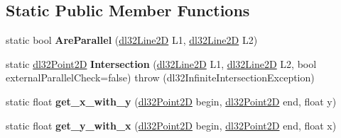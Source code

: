 \subsection*{Static Public Member Functions}
\begin{DoxyCompactItemize}
\item 
\hypertarget{classdl32_line2_d_a9a0d706a3d8b539e59c953d84c6b7fa3}{static bool {\bfseries Are\-Parallel} (\hyperlink{classdl32_line2_d}{dl32\-Line2\-D} L1, \hyperlink{classdl32_line2_d}{dl32\-Line2\-D} L2)}\label{classdl32_line2_d_a9a0d706a3d8b539e59c953d84c6b7fa3}

\item 
\hypertarget{classdl32_line2_d_acfda3e6a8bdaba2cc699d553cf502295}{static \hyperlink{structdl32_point2_d}{dl32\-Point2\-D} {\bfseries Intersection} (\hyperlink{classdl32_line2_d}{dl32\-Line2\-D} L1, \hyperlink{classdl32_line2_d}{dl32\-Line2\-D} L2, bool external\-Parallel\-Check=false)  throw (dl32\-Infinite\-Intersection\-Exception)}\label{classdl32_line2_d_acfda3e6a8bdaba2cc699d553cf502295}

\item 
\hypertarget{classdl32_line2_d_a7f53a9b4e7823b36dbd028df2277ece5}{static float {\bfseries get\-\_\-x\-\_\-with\-\_\-y} (\hyperlink{structdl32_point2_d}{dl32\-Point2\-D} begin, \hyperlink{structdl32_point2_d}{dl32\-Point2\-D} end, float y)}\label{classdl32_line2_d_a7f53a9b4e7823b36dbd028df2277ece5}

\item 
\hypertarget{classdl32_line2_d_a585d0624dce51ee680ec5ca0c0853471}{static float {\bfseries get\-\_\-y\-\_\-with\-\_\-x} (\hyperlink{structdl32_point2_d}{dl32\-Point2\-D} begin, \hyperlink{structdl32_point2_d}{dl32\-Point2\-D} end, float x)}\label{classdl32_line2_d_a585d0624dce51ee680ec5ca0c0853471}

\end{DoxyCompactItemize}

